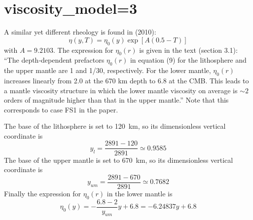 \newpage
\section*{viscosity\_model=3}

A similar yet different rheology is found in \textcite{zhzl10} (2010):
\[
\eta(y,T) = \eta_0(y) \exp [A(0.5-T)]
\]
with $A=9.2103$. The expression for $\eta_0(r)$ is given in the text (section 3.1):
``The depth‐dependent prefactors $\eta_0(r)$ in equation (9)
for the lithosphere and the upper mantle are 1 and 1/30,
respectively. For the lower mantle, $\eta_0(r)$ increases
linearly from 2.0 at the 670 km depth to 6.8 at the CMB. This
leads to a mantle viscosity structure in which the lower mantle
viscosity on average is $\sim 2$ orders of magnitude higher than
that in the upper mantle.'' 
Note that this corresponds to case FS1 in the paper. 

The base of the lithosphere is set to 120~\si{\km}, so its dimensionless
vertical coordinate is 
\[
y_l = \frac{2891-120}{2891} \simeq 0.9585
\] 
The base of the upper mantle is set to 670~\si{\km}, so its dimensionless
vertical coordinate is 
\[
y_{um} = \frac{2891-670}{2891} \simeq 0.7682
\] 
Finally the expression for $\eta_0(r)$ in the lower mantle 
is 
\[
\eta_0(y)= - \frac{6.8-2}{y_{um}} y + 6.8 = -6.24837 y + 6.8
\]


